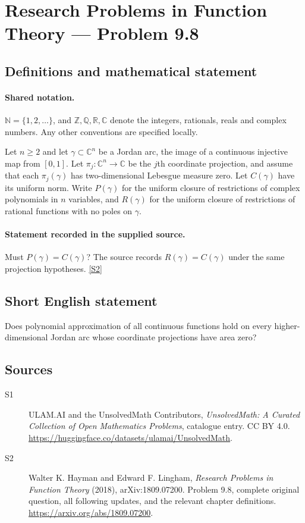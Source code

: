 \documentclass[11pt]{book}
\newcommand{\sref}[2]{\hyperlink{source:#1:#2}{[S#2]}}
\begin{document}
\section{Research Problems in Function Theory — Problem 9.8}\label{statement}

\subsection{Definitions and mathematical statement}

\paragraph{Shared notation.}$\mathbb N=\{1,2,\ldots\}$, and $\mathbb Z,\mathbb Q,\mathbb R,\mathbb C$ denote the integers, rationals, reals and complex numbers. Any other conventions are specified locally.


Let $n\ge2$ and let $\gamma\subset\mathbb C^n$ be a Jordan arc, the image of a continuous injective map from $[0,1]$. Let $\pi_j:\mathbb C^n\to\mathbb C$ be the $j$th coordinate projection, and assume that each $\pi_j(\gamma)$ has two-dimensional Lebesgue measure zero. Let $C(\gamma)$ have its uniform norm. Write $P(\gamma)$ for the uniform closure of restrictions of complex polynomials in $n$ variables, and $R(\gamma)$ for the uniform closure of restrictions of rational functions with no poles on $\gamma$.
\paragraph{Statement recorded in the supplied source.}
Must $P(\gamma)=C(\gamma)$? The source records $R(\gamma)=C(\gamma)$ under the same projection hypotheses. \sref{statement}{2}
\subsection{Short English statement}
Does polynomial approximation of all continuous functions hold on every higher-dimensional Jordan arc whose coordinate projections have area zero?
\subsection{Sources}
\begin{description}
\item[\hypertarget{source:statement:1}{S1}] ULAM.AI and the UnsolvedMath Contributors, \emph{UnsolvedMath: A Curated Collection of Open Mathematics Problems}, catalogue entry. CC BY 4.0. \url{https://huggingface.co/datasets/ulamai/UnsolvedMath}.
\item[\hypertarget{source:statement:2}{S2}] Walter K. Hayman and Edward F. Lingham, \emph{Research Problems in Function Theory} (2018), arXiv:1809.07200. Problem 9.8, complete original question, all following updates, and the relevant chapter definitions. \url{https://arxiv.org/abs/1809.07200}.
\end{description}
\label{end:statement}
\end{document}
